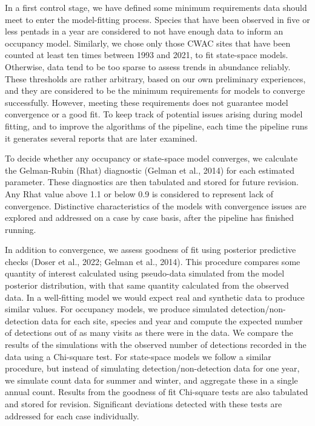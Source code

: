 \documentclass[utf8]{frontiersSCNS}
\begin{document}
In a first control stage, we have defined some minimum requirements data
should meet to enter the model-fitting process. Species that have been
observed in five or less pentads in a year are considered to not have
enough data to inform an occupancy model. Similarly, we chose only those
CWAC sites that have been counted at least ten times between 1993 and
2021, to fit state-space models. Otherwise, data tend to be too sparse
to assess trends in abundance reliably. These thresholds are rather
arbitrary, based on our own preliminary experiences, and they are
considered to be the minimum requirements for models to converge
successfully. However, meeting these requirements does not guarantee
model convergence or a good fit. To keep track of potential issues
arising during model fitting, and to improve the algorithms of the
pipeline, each time the pipeline runs it generates several reports that
are later examined.

To decide whether any occupancy or state-space model converges, we
calculate the Gelman-Rubin (Rhat) diagnostic (Gelman et al., 2014) for
each estimated parameter. These diagnostics are then tabulated and
stored for future revision. Any Rhat value above 1.1 or below 0.9 is
considered to represent lack of convergence. Distinctive characteristics
of the models with convergence issues are explored and addressed on a
case by case basis, after the pipeline has finished running.

In addition to convergence, we assess goodness of fit using posterior
predictive checks (Doser et al., 2022; Gelman et al., 2014). This
procedure compares some quantity of interest calculated using
pseudo-data simulated from the model posterior distribution, with that
same quantity calculated from the observed data. In a well-fitting model
we would expect real and synthetic data to produce similar values. For
occupancy models, we produce simulated detection/non-detection data for
each site, species and year and compute the expected number of
detections out of as many visits as there were in the data. We compare
the results of the simulations with the observed number of detections
recorded in the data using a Chi-square test. For state-space models we
follow a similar procedure, but instead of simulating
detection/non-detection data for one year, we simulate count data for
summer and winter, and aggregate these in a single annual count. Results
from the goodness of fit Chi-square tests are also tabulated and stored
for revision. Significant deviations detected with these tests are
addressed for each case individually.
\end{document}
